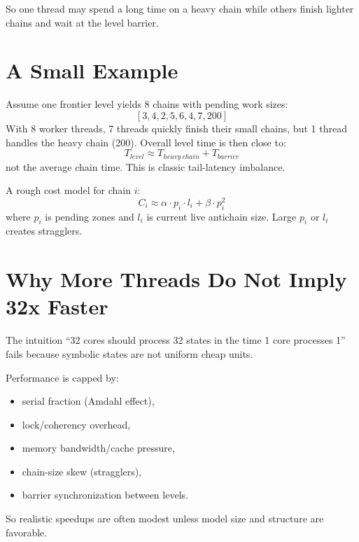 \documentclass[11pt,a4paper]{article}
\begin{document}
So one thread may spend a long time on a heavy chain while others finish lighter chains and wait at the level barrier.

\section{A Small Example}
Assume one frontier level yields 8 chains with pending work sizes:
\[
[3, 4, 2, 5, 6, 4, 7, 200]
\]
With 8 worker threads, 7 threads quickly finish their small chains, but 1 thread handles the heavy chain (200). Overall level time is then close to:
\[
T_{level} \approx T_{heavy\ chain} + T_{barrier}
\]
not the average chain time. This is classic tail-latency imbalance.

A rough cost model for chain $i$:
\[
C_i \approx \alpha \cdot p_i \cdot l_i + \beta \cdot p_i^2
\]
where $p_i$ is pending zones and $l_i$ is current live antichain size.
Large $p_i$ or $l_i$ creates stragglers.

\section{Why More Threads Do Not Imply 32x Faster}
The intuition ``32 cores should process 32 states in the time 1 core processes 1'' fails because symbolic states are not uniform cheap units.

Performance is capped by:
\begin{itemize}
  \item serial fraction (Amdahl effect),
  \item lock/coherency overhead,
  \item memory bandwidth/cache pressure,
  \item chain-size skew (stragglers),
  \item barrier synchronization between levels.
\end{itemize}

So realistic speedups are often modest unless model size and structure are favorable.
\end{document}
